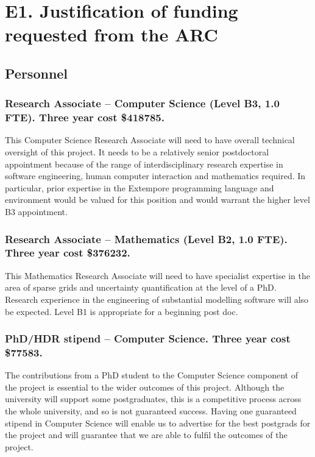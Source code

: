 \documentclass[a4paper,fontsize=12pt]{scrartcl}
\author{}
\date{\today}
\begin{document}
\section*{E1. Justification of funding requested from the ARC}
\label{sec:justificatoin}

\subsection*{Personnel}


\subsubsection*{Research Associate – Computer Science (Level B3, 1.0 FTE). Three year cost \$418785.}

This Computer Science Research Associate will need to have overall technical oversight of this project. It needs to be a relatively senior postdoctoral appointment because of the range of interdisciplinary research expertise in software engineering, human computer interaction and mathematics required. In particular, prior expertise in the Extempore programming language and environment would be valued for this position and would warrant the higher level B3 appointment.


\subsubsection*{Research Associate – Mathematics (Level B2, 1.0 FTE).  Three year cost \$376232.}

This Mathematics Research Associate will need to have specialist expertise in the area of sparse grids and uncertainty quantification at the level of a PhD.  Research experience in the engineering of substantial modelling software will also be expected. Level B1 is appropriate for a beginning post doc. 

\subsubsection*{PhD/HDR stipend – Computer Science.  Three year cost \$77583.}

The contributions from a PhD student to the Computer Science component of the project is essential to the wider outcomes of this project.
Although the university will support some postgraduates, this is a competitive
process across the whole university, and so is not guaranteed success. Having one guaranteed stipend in Computer Science will enable us to advertise for the best postgrads for the project and will guarantee that we are able to fulfil the outcomes of the project. 
\end{document}
